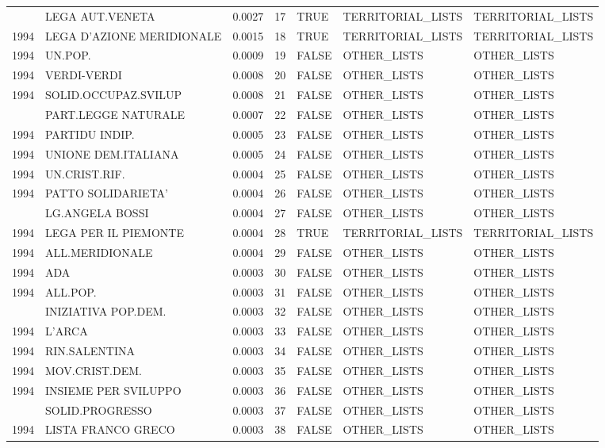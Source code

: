 \begin{longtable}[t]{rlrrlll}
\addlinespace
1994 & LEGA AUT.VENETA & 0.0027 & 17 & TRUE & TERRITORIAL\_LISTS & TERRITORIAL\_LISTS\\
1994 & LEGA D'AZIONE MERIDIONALE & 0.0015 & 18 & TRUE & TERRITORIAL\_LISTS & TERRITORIAL\_LISTS\\
1994 & UN.POP. & 0.0009 & 19 & FALSE & OTHER\_LISTS & OTHER\_LISTS\\
1994 & VERDI-VERDI & 0.0008 & 20 & FALSE & OTHER\_LISTS & OTHER\_LISTS\\
1994 & SOLID.OCCUPAZ.SVILUP & 0.0008 & 21 & FALSE & OTHER\_LISTS & OTHER\_LISTS\\
\addlinespace
1994 & PART.LEGGE NATURALE & 0.0007 & 22 & FALSE & OTHER\_LISTS & OTHER\_LISTS\\
1994 & PARTIDU INDIP. & 0.0005 & 23 & FALSE & OTHER\_LISTS & OTHER\_LISTS\\
1994 & UNIONE DEM.ITALIANA & 0.0005 & 24 & FALSE & OTHER\_LISTS & OTHER\_LISTS\\
1994 & UN.CRIST.RIF. & 0.0004 & 25 & FALSE & OTHER\_LISTS & OTHER\_LISTS\\
1994 & PATTO SOLIDARIETA' & 0.0004 & 26 & FALSE & OTHER\_LISTS & OTHER\_LISTS\\
\addlinespace
1994 & LG.ANGELA BOSSI & 0.0004 & 27 & FALSE & OTHER\_LISTS & OTHER\_LISTS\\
1994 & LEGA PER IL PIEMONTE & 0.0004 & 28 & TRUE & TERRITORIAL\_LISTS & TERRITORIAL\_LISTS\\
1994 & ALL.MERIDIONALE & 0.0004 & 29 & FALSE & OTHER\_LISTS & OTHER\_LISTS\\
1994 & ADA & 0.0003 & 30 & FALSE & OTHER\_LISTS & OTHER\_LISTS\\
1994 & ALL.POP. & 0.0003 & 31 & FALSE & OTHER\_LISTS & OTHER\_LISTS\\
\addlinespace
1994 & INIZIATIVA POP.DEM. & 0.0003 & 32 & FALSE & OTHER\_LISTS & OTHER\_LISTS\\
1994 & L'ARCA & 0.0003 & 33 & FALSE & OTHER\_LISTS & OTHER\_LISTS\\
1994 & RIN.SALENTINA & 0.0003 & 34 & FALSE & OTHER\_LISTS & OTHER\_LISTS\\
1994 & MOV.CRIST.DEM. & 0.0003 & 35 & FALSE & OTHER\_LISTS & OTHER\_LISTS\\
1994 & INSIEME PER SVILUPPO & 0.0003 & 36 & FALSE & OTHER\_LISTS & OTHER\_LISTS\\
\addlinespace
1994 & SOLID.PROGRESSO & 0.0003 & 37 & FALSE & OTHER\_LISTS & OTHER\_LISTS\\
1994 & LISTA FRANCO GRECO & 0.0003 & 38 & FALSE & OTHER\_LISTS & OTHER\_LISTS\\

\end{longtable}

